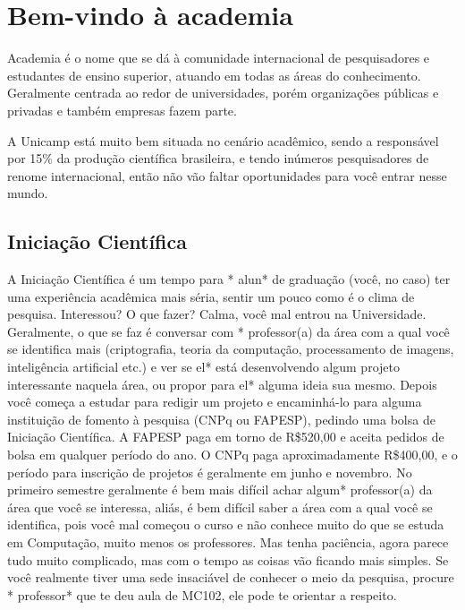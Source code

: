 
\section{Bem-vindo à academia}

Academia é o nome que se dá à comunidade internacional de pesquisadores e
estudantes de ensino superior, atuando em todas as áreas do
conhecimento. Geralmente centrada ao redor de universidades, porém organizações
públicas e privadas e também empresas fazem parte.

A Unicamp está muito bem situada no cenário acadêmico, sendo a responsável por
15\% da produção científica brasileira, e tendo inúmeros pesquisadores de renome
internacional, então não vão faltar oportunidades para você entrar nesse mundo.

\subsection{Iniciação Científica}

A Iniciação Científica é um tempo para * alun* de graduação (você, no caso) ter
uma experiência acadêmica mais séria, sentir um pouco como é o clima de
pesquisa. Interessou? O que fazer? Calma, você mal entrou na Universidade.
Geralmente, o que se faz é conversar com * professor(a) da área com a qual você
se identifica mais (criptografia, teoria da computação, processamento de
imagens, inteligência artificial etc.) e ver se el* está desenvolvendo algum
projeto interessante naquela área, ou propor para el* alguma ideia sua mesmo.
Depois você começa a estudar para redigir um projeto e encaminhá-lo para alguma
instituição de fomento à pesquisa (CNPq ou FAPESP), pedindo uma bolsa de
Iniciação Científica. A FAPESP paga em torno de R\$520,00 e aceita pedidos de
bolsa em qualquer período do ano. O CNPq paga aproximadamente R\$400,00, e o
período para inscrição de projetos é geralmente em junho e novembro. No primeiro
semestre geralmente é bem mais difícil achar algum* professor(a) da área que
você se interessa, aliás, é bem difícil saber a área com a qual você se
identifica, pois você mal começou o curso e não conhece muito do que se estuda
em Computação, muito menos os professores. Mas tenha paciência, agora parece
tudo muito complicado, mas com o tempo as coisas vão ficando mais simples. Se
você realmente tiver uma sede insaciável de conhecer o meio da pesquisa, procure
* professor* que te deu aula de MC102, ele pode te orientar a respeito.

